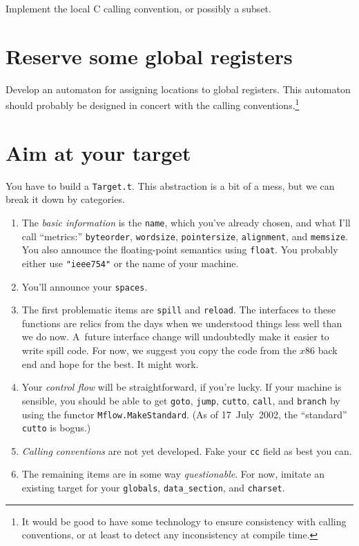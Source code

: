 \documentclass[12pt]{article}
\begin{document}
Implement the local C calling convention, or possibly a subset.


\section{Reserve some global registers}

Develop an automaton for assigning locations to global registers.
This automaton should probably be designed in concert with the calling
conventions.\footnote
{It would be good to have some technology to ensure consistency with
calling conventions, or at least to detect any inconsistency at
compile time.}


\section{Aim at your target}

You have to build a \texttt{Target.t}.
This abstraction is a bit of a mess, but we can break it down by
categories. 
\begin{enumerate} 
\item
The \emph{basic information} is the \texttt{name}, which you've already
chosen, and what I'll call ``metrics:''
\texttt{byteorder}, \texttt{wordsize}, \texttt{pointersize},
\texttt{alignment}, and \texttt{memsize}.
You also announce the floating-point semantics using \texttt{float}.
You probably either use \texttt{"ieee754"} or the name of your
machine. 
\item
You'll announce your \texttt{spaces}.
\item
The first problematic items are \texttt{spill} and \texttt{reload}.
The interfaces to these functions are relics from the days when we
understood things less well than we do now.
A~future interface change will undoubtedly make it easier to write
spill code.
For now, we suggest you copy the code from the $x$86 back end and hope
for the best.
It might work.
\item
Your \emph{control flow} will be straightforward, if you're lucky.
If your machine is sensible, 
you should be able to get \texttt{goto}, \texttt{jump},
\texttt{cutto}, \texttt{call}, and \texttt{branch} by using the functor
\texttt{Mflow.MakeStandard}. 
(As of 17~July~2002, the ``standard'' \texttt{cutto} is bogus.)
\item
\emph{Calling conventions} are not yet developed.
Fake your \texttt{cc} field as best you can.
\item
The remaining items are in some way \emph{questionable}.
For now, imitate an existing target for your \texttt{globals},
\texttt{data\_section}, and \texttt{charset}.
\end{enumerate}
\end{document}
